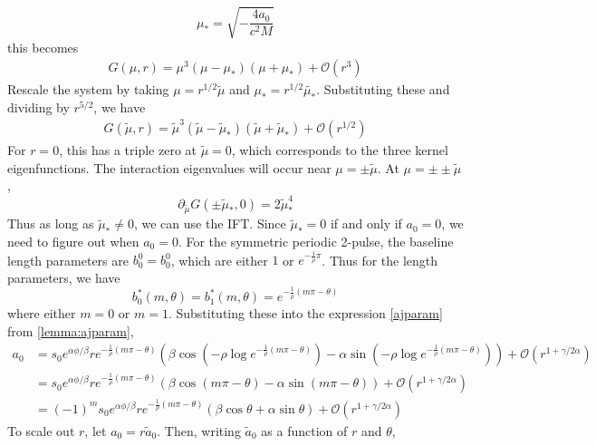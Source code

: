 \documentclass[thesis.tex]{subfiles}
\begin{document}
\begin{equation}
\mu_* = \sqrt{- \frac{4 a_0}{c^2 M}}
\end{equation}
this becomes
\begin{equation*}
\begin{aligned}
G(\mu, r) = \mu^3 (\mu - \mu_*)(\mu + \mu_*) + \mathcal{O}( r^3 ) 
\end{aligned}
\end{equation*}
Rescale the system by taking $\mu = r^{1/2} \tilde{\mu}$ and $\mu_* = r^{1/2} \tilde{\mu_*}$. Substituting these and dividing by $r^{5/2}$, we have
\begin{equation*}
\begin{aligned}
G(\tilde{\mu}, r) = \tilde{\mu}^3 (\tilde{\mu} - \tilde{\mu}_*)(\tilde{\mu} + \tilde{\mu}_*) + \mathcal{O}( r^{1/2} ) 
\end{aligned}
\end{equation*}
For $r = 0$, this has a triple zero at $\tilde{\mu} = 0$, which corresponds to the three kernel eigenfunctions. The interaction eigenvalues will occur near $\mu = \pm \tilde{\mu}$. At $\mu = \pm \pm \tilde{\mu}$, 
\[
\partial_{\tilde{\mu}}G(\pm \tilde{\mu}_*, 0) = 2 \tilde{\mu}_*^4
\]
Thus as long as $\tilde{\mu}_* \neq 0$, we can use the IFT. Since $\tilde{\mu}_* = 0$ if and only if $a_0 = 0$, we need to figure out when $a_0 = 0$. For the symmetric periodic 2-pulse, the baseline length parameters are $b_0^0 = b_0^0$, which are either $1$ or $e^{-\frac{1}{\rho} \pi}$. Thus for the length parameters, we have
\[
b_0^*(m, \theta) = b_1^*(m, \theta) = e^{-\frac{1}{\rho}(m \pi - \theta) }
\]
where either $m = 0$ or $m = 1$. Substituting these into the expression \cref{ajparam} from \cref{lemma:ajparam}, 
\begin{align*}
a_0 &= s_0 e^{\alpha \phi/\beta} r e^{-\frac{1}{\rho}(m \pi - \theta) } \left( \beta \cos\left(-\rho \log e^{-\frac{1}{\rho}(m \pi - \theta) } \right) - \alpha \sin \left(-\rho \log e^{-\frac{1}{\rho}(m \pi - \theta) } \right) \right) + \mathcal{O}(r^{1+\gamma/2\alpha}) \\
&= s_0 e^{\alpha \phi/\beta} r e^{-\frac{1}{\rho}(m \pi - \theta) } \left( \beta \cos\left( m \pi - \theta \right) - \alpha \sin \left( m \pi - \theta \right) \right) + \mathcal{O}(r^{1+\gamma/2\alpha}) \\
&= (-1)^m s_0 e^{\alpha \phi/\beta} r e^{-\frac{1}{\rho}(m \pi - \theta) } \left( \beta \cos \theta + \alpha \sin \theta \right) + \mathcal{O}(r^{1+\gamma/2\alpha}) 
\end{align*}
To scale out $r$, let $a_0 = r \tilde{a}_0$. Then, writing $\tilde{a}_0$ as a function of $r$ and $\theta$,
\end{document}
